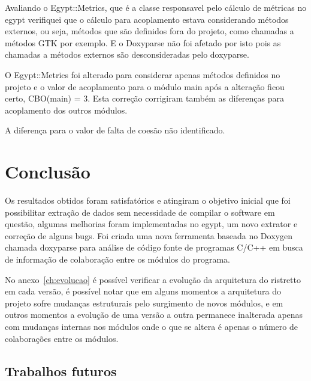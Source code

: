 Avaliando o Egypt::Metrics, que é a classe responsavel pelo cálculo de métricas
no egypt verifiquei que o cálculo para acoplamento estava considerando métodos
externos, ou seja, métodos que são definidos fora do projeto, como chamadas a
métodos GTK por exemplo. E o Doxyparse não foi
afetado por isto pois as chamadas a métodos externos são desconsideradas pelo
doxyparse.

O Egypt::Metrics foi alterado para considerar apenas métodos definidos no
projeto e o valor de acoplamento para o módulo main após a alteração ficou
certo, CBO(main) = 3. Esta correção corrigiram também as diferenças para
acoplamento dos outros módulos.

A diferença para o valor de falta de coesão não identificado.

\chapter{Conclusão} \label{ch:conclusao}

Os resultados obtidos foram satisfatórios e atingiram o objetivo inicial que
foi possibilitar extração de dados sem necessidade de compilar o software em
questão, algumas melhorias foram implementadas no egypt, um novo extrator e
correção de alguns bugs. Foi criada uma nova ferramenta baseada no Doxygen
chamada doxyparse para análise de código fonte de programas C/C++ em busca de
informação de colaboração entre os módulos do programa.

No anexo~\ref{ch:evolucao} é possível verificar a evolução da arquitetura do
ristretto em cada versão, é possível notar que em alguns momentos a arquitetura
do projeto sofre mudanças estruturais pelo surgimento de novos módulos, e em
outros momentos a evolução de uma versão a outra permanece inalterada apenas
com mudanças internas nos módulos onde o que se altera é apenas o número de
colaborações entre os módulos.

\section{Trabalhos futuros}

